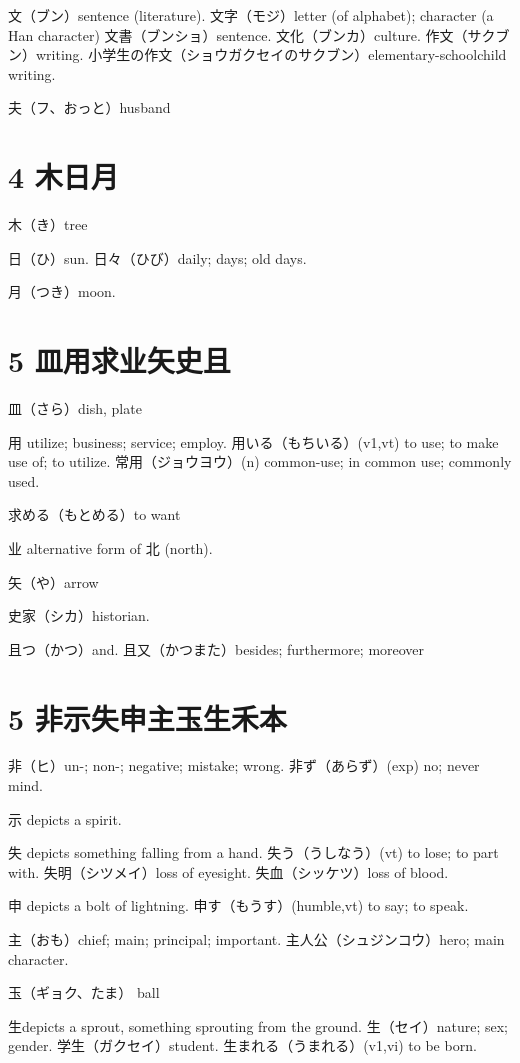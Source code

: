 文（ブン）sentence (literature).
文字（モジ）letter (of alphabet); character (a Han character)
文書（ブンショ）sentence.
文化（ブンカ）culture.
作文（サクブン）writing.
小学生の作文（ショウガクセイのサクブン）elementary-schoolchild writing.

夫（フ、おっと）husband

\section{4 木日月}

木（き）tree

日（ひ）sun.
日々（ひび）daily; days; old days.

月（つき）moon.

\section{5 皿用求业矢史且}

皿（さら）dish, plate

用 utilize; business; service; employ.
用いる（もちいる）(v1,vt) to use; to make use of; to utilize.
常用（ジョウヨウ）(n) common-use; in common use; commonly used.

求める（もとめる）to want

业 alternative form of 北 (north).

矢（や）arrow

史家（シカ）historian.

且つ（かつ）and.
且又（かつまた）besides; furthermore; moreover

\section{5 非⽰失申主玉生禾本}

非（ヒ）un-; non-; negative; mistake; wrong.
非ず（あらず）(exp) no; never mind.

⽰ depicts a spirit.

失 depicts something falling from a hand.
失う（うしなう）(vt) to lose; to part with.
失明（シツメイ）loss of eyesight.
失血（シッケツ）loss of blood.

申 depicts a bolt of lightning.
申す（もうす）(humble,vt) to say; to speak.

主（おも）chief; main; principal; important.
主人公（シュジンコウ）hero; main character.

玉（ギョク、たま） ball

生depicts a sprout, something sprouting from the ground.
生（セイ）nature; sex; gender.
学生（ガクセイ）student.
生まれる（うまれる）(v1,vi) to be born.

